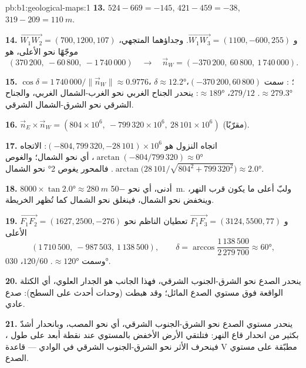 \begin{solution}{pb:b1:geological-maps:1}
\textbf{13.} $524 - 669 = -145$, $421 - 459 = -38$, $319 - 209 =
\qty{110}{m}$.

\textbf{14.} $\overrightarrow{W_1W_2} = (700, 1200, 107)$ و
$\overrightarrow{W_1W_3} = (1100, -600, 255)$. وجداؤهما المتجهي، موجّهًا نحو الأعلى، هو
\[
  (370\,200,\ -60\,800,\ -1\,740\,000) \quad\longrightarrow\quad
  \vec n_W = (-370\,200,\ 60\,800,\ 1\,740\,000).
\]

\textbf{15.} $\cos\delta = 1\,740\,000/\|\vec n_W\| \approx 0.9776$، $\delta
\approx \ang{12.2}$؛ : سمت $(-370\,200, 60\,800)$،
$\approx \ang{279.3}$.  $279/12$،  $\approx \ang{189}$: ينحدر الجناح الغربي نحو الغرب-الشمال الغربي، والجناح الشرقي نحو الشرق-الشمال الشرقي.

\textbf{16.} $\vec n_E \times \vec n_W = (804 \times 10^6,\ -799\,320 \times
10^6,\ 28\,101 \times 10^6)$ (مقرّبًا).

\textbf{17.} اتجاه النزول هو $(-804, 799\,320, -28\,101) \times
10^6$: الاتجاه $\arctan(-804/799\,320) \approx \ang{0}$، أي نحو الشمال؛ والغوص
$\arctan\bigl(28\,101/\sqrt{804^2 + 799\,320^2}\bigr) \approx \ang{2.0}$. فالمحور يغوص \ang{2} نحو الشمال.

\textbf{18.} $8000 \times \tan\ang{2.0} \approx \qty{280}{m}$ أدنى، أي نحو
\qty{-50}{m}. ولبّ  أعلى ما يكون قرب النهر، وينخفض نحو الشمال، فينغلق  نحو الشمال كما تُظهر الخريطة.

\textbf{19.} $\overrightarrow{F_1F_2} = (1627, 2500, -276)$ و
$\overrightarrow{F_1F_3} = (3124, 5500, 77)$ تعطيان الناظم نحو الأعلى
\[
  (1\,710\,500,\ -987\,503,\ 1\,138\,500), \qquad
  \delta = \arccos\frac{1\,138\,500}{2\,279\,700} \approx \ang{60},
\]
وسمت  $\approx \ang{120}$.  $120/60$، 
\ang{030}.

\textbf{20.} ينحدر الصدع نحو الشرق-الجنوب الشرقي، فهذا الجانب هو الجدار العلوي، أي الكتلة الواقعة فوق مستوي الصدع المائل؛ وقد هبطت (وحدات أحدث على السطح): صدع عادي.

\textbf{21.} ينحدر مستوي الصدع نحو الشرق-الجنوب الشرقي، أي نحو المصب، وبانحدار أشدّ بكثير من انحدار قاع النهر: فتلتقي الأرض الأخفض بالمستوي عند نقطة أبعد على طول ، فينحرف الأثر نحو الشرق-الجنوب الشرقي في الوادي --- قاعدة V مطبّقة على مستوي الصدع.


\end{solution}

